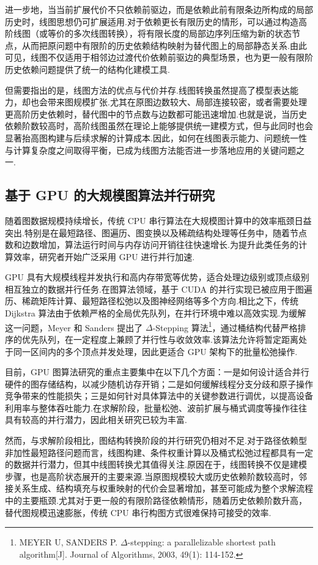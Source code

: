 进一步地，当当前扩展代价不只依赖前驱边，而是依赖此前有限条边所构成的局部历史时，线图思想仍可扩展适用.对于依赖更长有限历史的情形，可以通过构造高阶线图（或等价的多次线图转换），将有限长度的局部边序列压缩为新的状态节点，从而把原问题中有限阶的历史依赖结构映射为替代图上的局部静态关系.由此可见，线图不仅适用于相邻边过渡代价依赖前驱边的典型场景，也为更一般有限阶历史依赖问题提供了统一的结构化建模工具.

但需要指出的是，线图方法的优点与代价并存.线图转换虽然提高了模型表达能力，却也会带来图规模扩张.尤其在原图边数较大、局部连接较密，或者需要处理更高阶历史依赖时，替代图中的节点数与边数都可能迅速增加.也就是说，当历史依赖阶数较高时，高阶线图虽然在理论上能够提供统一建模方式，但与此同时也会显著抬高图构建与后续求解的计算成本.因此，如何在线图表示能力、问题统一性与计算复杂度之间取得平衡，已成为线图方法能否进一步落地应用的关键问题之一.

\subsection{基于 GPU 的大规模图算法并行研究}

随着图数据规模持续增长，传统 CPU 串行算法在大规模图计算中的效率瓶颈日益突出.特别是在最短路径、图遍历、图变换以及稀疏结构处理等任务中，随着节点数和边数增加，算法运行时间与内存访问开销往往快速增长.为提升此类任务的计算效率，研究者开始广泛采用 GPU 进行并行加速.

GPU 具有大规模线程并发执行和高内存带宽等优势，适合处理边级别或顶点级别相互独立的数据并行任务.在图算法领域，基于 CUDA 的并行实现已被应用于图遍历、稀疏矩阵计算、最短路径松弛以及图神经网络等多个方向.相比之下，传统 Dijkstra 算法由于依赖严格的全局优先队列，在并行环境中难以高效实现.为缓解这一问题，Meyer 和 Sanders 提出了 $\Delta$-Stepping 算法\footnote{MEYER U, SANDERS P. $\Delta$-stepping: a parallelizable shortest path algorithm[J]. Journal of Algorithms, 2003, 49(1): 114-152.}，通过桶结构代替严格排序的优先队列，在一定程度上兼顾了并行性与收敛效率.该算法允许将暂定距离处于同一区间内的多个顶点并发处理，因此更适合 GPU 架构下的批量松弛操作.

目前，GPU 图算法研究的重点主要集中在以下几个方面：一是如何设计适合并行硬件的图存储结构，以减少随机访存开销；二是如何缓解线程分支分歧和原子操作竞争带来的性能损失；三是如何针对具体算法中的关键参数进行调优，以提高设备利用率与整体吞吐能力.在求解阶段，批量松弛、波前扩展与桶式调度等操作往往具有较高的并行潜力，因此相关研究已较为丰富.

然而，与求解阶段相比，图结构转换阶段的并行研究仍相对不足.对于路径依赖型非加性最短路径问题而言，线图构建、条件权重计算以及桶式松弛过程都具有一定的数据并行潜力，但其中线图转换尤其值得关注.原因在于，线图转换不仅是建模步骤，也是高阶状态展开的主要来源.当原图规模较大或历史依赖阶数较高时，邻接关系生成、结构填充与权重映射的代价会显著增加，甚至可能成为整个求解流程中的主要瓶颈.尤其对于更一般的有限阶路径依赖情形，随着历史依赖阶数升高，替代图规模迅速膨胀，传统 CPU 串行构图方式很难保持可接受的效率.


